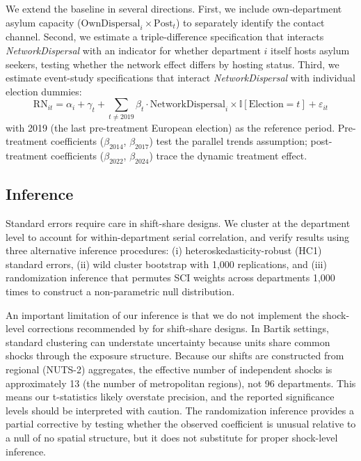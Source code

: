 \documentclass[12pt]{article}
\newcommand{\ind}{\mathbb{I}}
\begin{document}
We extend the baseline in several directions. First, we include own-department asylum capacity ($\text{OwnDispersal}_i \times \text{Post}_t$) to separately identify the contact channel. Second, we estimate a triple-difference specification that interacts \textit{NetworkDispersal} with an indicator for whether department $i$ itself hosts asylum seekers, testing whether the network effect differs by hosting status. Third, we estimate event-study specifications that interact \textit{NetworkDispersal} with individual election dummies:
\begin{equation}
\text{RN}_{it} = \alpha_i + \gamma_t + \sum_{t \neq 2019} \beta_t \cdot \text{NetworkDispersal}_i \times \ind[\text{Election} = t] + \varepsilon_{it}
\label{eq:eventstudy}
\end{equation}
with 2019 (the last pre-treatment European election) as the reference period. Pre-treatment coefficients ($\beta_{2014}$, $\beta_{2017}$) test the parallel trends assumption; post-treatment coefficients ($\beta_{2022}$, $\beta_{2024}$) trace the dynamic treatment effect.

\subsection{Inference}

Standard errors require care in shift-share designs. We cluster at the department level to account for within-department serial correlation, and verify results using three alternative inference procedures: (i) heteroskedasticity-robust (HC1) standard errors, (ii) wild cluster bootstrap \citep{cameron2008bootstrap} with 1,000 replications, and (iii) randomization inference that permutes SCI weights across departments 1,000 times to construct a non-parametric null distribution.

An important limitation of our inference is that we do not implement the shock-level corrections recommended by \citet{adao2019shift} for shift-share designs. In Bartik settings, standard clustering can understate uncertainty because units share common shocks through the exposure structure. Because our shifts are constructed from regional (NUTS-2) aggregates, the effective number of independent shocks is approximately 13 (the number of metropolitan regions), not 96 departments. This means our t-statistics likely overstate precision, and the reported significance levels should be interpreted with caution. The randomization inference provides a partial corrective by testing whether the observed coefficient is unusual relative to a null of no spatial structure, but it does not substitute for proper shock-level inference.
\end{document}
